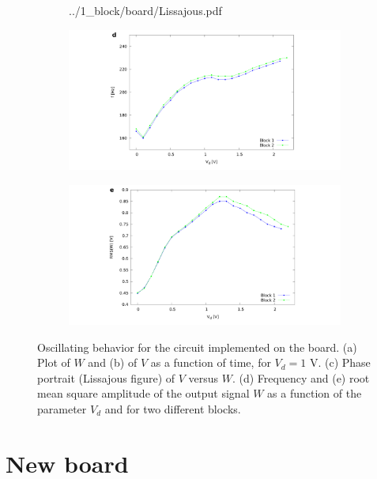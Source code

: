 \begin{figure}[H]
\begin{subfigure}{.39\textwidth}
        {../1_block/board/Lissajous.pdf}
    \end{subfigure}
    \begin{subfigure}{.49\textwidth}
        \includegraphics[width=\linewidth,trim={10cm 0 9cm 0},clip,left]
        {../1_block/board/freq_board.pdf}
    \end{subfigure}
    \begin{subfigure}{.49\textwidth}
        \centering
        \includegraphics[width=\linewidth,trim={9cm 0 10cm 0},clip,right]
        {../1_block/board/rms_board.pdf}
    \end{subfigure}
    \caption{Oscillating behavior for the circuit implemented on
    the board. (a) Plot of $W$ and (b) of $V$ as a
    function of time, for $V_d=1$ V.
    (c) Phase portrait (Lissajous figure) of $V$ versus $W$. (d)
    Frequency and (e) root mean square amplitude of the
    output signal $W$ as a function of the parameter $V_d$ and for
    two different blocks.}
    \label{fig:oscillation board}
\end{figure}


\section{New board}\label{sec:new board}

